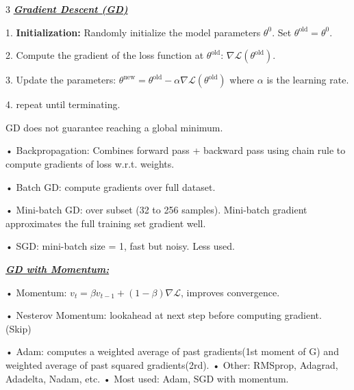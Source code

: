 \documentclass[12pt]{article}
\newcommand{\bulletPoint}[1]{\underline{\textit{\textbf{#1}}}}
\begin{document}
\begin{multicols*}{3}
\bulletPoint{Gradient Descent (GD)} \quad

1. \textbf{Initialization:} Randomly initialize the model parameters $\theta^0$. Set $\theta^{\text{old}} = \theta^0$.

2. Compute the gradient of the loss function at $\theta^{\text{old}}$: $\nabla \mathcal{L}(\theta^{\text{old}})$.

3. Update the parameters:
$\theta^{\text{new}} = \theta^{\text{old}} - \alpha \nabla \mathcal{L}(\theta^{\text{old}})$
where $\alpha$ is the learning rate.

4. repeat until terminating.

GD does not guarantee reaching a global minimum.

• Backpropagation: Combines forward pass + backward pass using chain rule to compute gradients of loss w.r.t. weights. 

• Batch GD: compute gradients over full dataset. 

• Mini-batch GD: over subset (32 to 256 samples). Mini-batch gradient approximates the full training set gradient well.

• SGD: mini-batch size = 1, fast but noisy. Less used. 

\bulletPoint{GD with Momentum:}

• Momentum: $v_t = \beta v_{t-1} + (1-\beta) \nabla \mathcal{L}$, improves convergence. \quad

• Nesterov Momentum: lookahead at next step before computing gradient. (Skip)

• Adam: computes a weighted average of past gradients(1st moment of G) and weighted average of past squared gradients(2rd). 
• Other: RMSprop, Adagrad, Adadelta, Nadam, etc. 
• Most used: Adam, SGD with momentum.





\end{multicols*}
\end{document}
